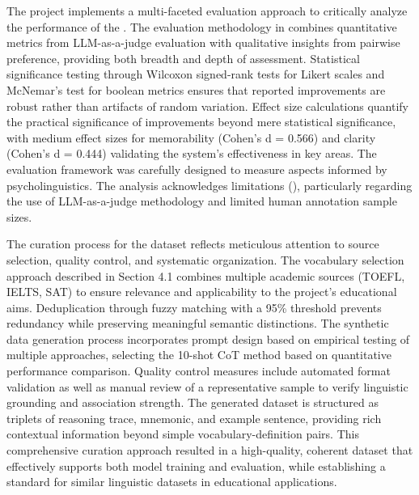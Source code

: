  The project implements a multi-faceted evaluation approach to critically analyze the performance of the \linksys. The evaluation methodology in  combines quantitative metrics from LLM-as-a-judge evaluation with qualitative insights from pairwise preference, providing both breadth and depth of assessment. Statistical significance testing through Wilcoxon signed-rank tests for Likert scales and McNemar's test for boolean metrics ensures that reported improvements are robust rather than artifacts of random variation. Effect size calculations quantify the practical significance of improvements beyond mere statistical significance, with medium effect sizes for memorability (Cohen's d = 0.566) and clarity (Cohen's d = 0.444) validating the system's effectiveness in key areas. The evaluation framework was carefully designed to measure aspects informed by psycholinguistics. The analysis acknowledges limitations (), particularly regarding the use of LLM-as-a-judge methodology and limited human annotation sample sizes.

 The curation process for the \links dataset reflects meticulous attention to source selection, quality control, and systematic organization. The vocabulary selection approach described in Section 4.1 combines multiple academic sources (TOEFL, IELTS, SAT) to ensure relevance and applicability to the project's educational aims. Deduplication through fuzzy matching with a 95\% threshold prevents redundancy while preserving meaningful semantic distinctions. The synthetic data generation process incorporates prompt design based on empirical testing of multiple approaches, selecting the 10-shot CoT method based on quantitative performance comparison. Quality control measures include automated format validation as well as manual review of a representative sample to verify linguistic grounding and association strength. The generated dataset is structured as triplets of reasoning trace, mnemonic, and example sentence, providing rich contextual information beyond simple vocabulary-definition pairs. This comprehensive curation approach resulted in a high-quality, coherent dataset that effectively supports both model training and evaluation, while establishing a standard for similar linguistic datasets in educational applications.

